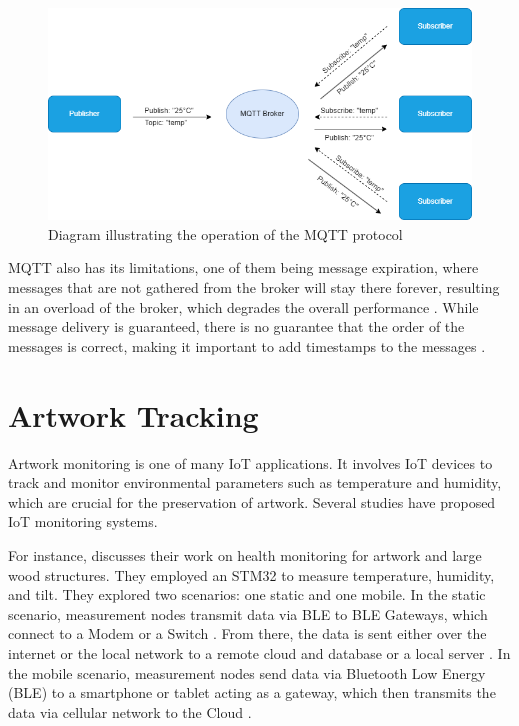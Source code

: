 \begin{figure}[H]
  \includegraphics[width=\linewidth]{MQTT_Diagram.png}
  \caption{Diagram illustrating the operation of the MQTT protocol}
  \label{fig:Diagram illustrating the operation of the MQTT protocol}
\end{figure}

MQTT also has its limitations, one of them being message expiration, where messages that are not gathered from the broker will stay there forever, resulting in an overload of the broker, which degrades the overall performance \cite{Soni2017}. While message delivery is guaranteed, there is no guarantee that the order of the messages is correct, making it important to add timestamps to the messages \cite{Soni2017}.

\section{Artwork Tracking}
Artwork monitoring is one of many IoT applications. It involves IoT devices to track and monitor environmental parameters such as temperature and humidity, which are crucial for the preservation of artwork. Several studies have proposed IoT monitoring systems. 

For instance, \cite{Fort2022} discusses their work on health monitoring for artwork and large wood structures. They employed an STM32 to measure temperature, humidity, and tilt. They explored two scenarios: one static and one mobile. In the static scenario, measurement nodes transmit data via BLE to BLE Gateways, which connect to a Modem or a Switch \cite{Fort2022}. From there, the data is sent either over the internet or the local network to a remote cloud and database or a local server \cite{Fort2022}. In the mobile scenario, measurement nodes send data via Bluetooth Low Energy (BLE) to a smartphone or tablet acting as a gateway, which then transmits the data via cellular network to the Cloud \cite{Fort2022}.

